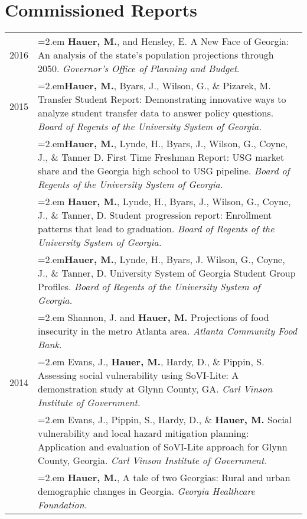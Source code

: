 \section{Commissioned Reports}
\begin{tabularx}{\linewidth}{lX}
2016    & \hangindent=2.em \textbf{Hauer, M.}, and Hensley, E. A New Face of Georgia: An analysis of the state's population projections through 2050. \textit{Governor's Office of Planning and Budget}.\\
2015    & \hangindent=2.em\textbf{Hauer, M.}, Byars, J., Wilson, G., \& Pizarek, M. Transfer Student Report: Demonstrating innovative ways to analyze             student transfer data to answer policy questions. \textit{Board of Regents of the University System of Georgia.}\\
      & \hangindent=2.em\textbf{Hauer, M.}, Lynde, H., Byars, J., Wilson, G., Coyne, J., \& Tanner D. First Time Freshman Report: USG market share and     the Georgia high school to USG pipeline. \textit{Board of Regents of the University System of Georgia.}\\
       & \hangindent=2.em \textbf{Hauer, M.}, Lynde, H., Byars, J., Wilson, G., Coyne, J., \& Tanner, D. Student progression report: Enrollment patterns     that lead to graduation. \textit{Board of Regents of the University System of Georgia.}\\
       & \hangindent=2.em\textbf{Hauer, M.}, Lynde, H., Byars, J. Wilson, G., Coyne, J., \& Tanner, D. University System of Georgia Student Group         Profiles. \textit{Board of Regents of the University System of Georgia.}\\
       & \hangindent=2.em Shannon, J. and \textbf{Hauer, M.} Projections of food insecurity in the metro Atlanta area. \textit{Atlanta Community Food     Bank.}\\
2014     & \hangindent=2.em Evans, J., \textbf{Hauer, M.}, Hardy, D., \& Pippin, S. Assessing social vulnerability using SoVI-Lite: A demonstration study             at Glynn County, GA. \textit{Carl Vinson Institute of Government.}\\
       & \hangindent=2.em Evans, J., Pippin, S., Hardy, D., \& \textbf{Hauer, M.} Social vulnerability and local hazard mitigation planning: Application     and evaluation of SoVI-Lite approach for Glynn County, Georgia. \textit{Carl Vinson Institute of Government.}\\
       & \hangindent=2.em \textbf{Hauer, M.}, A tale of two Georgias: Rural and urban demographic changes in Georgia. \textit{Georgia Healthcare            Foundation.}\\

\end{tabularx}
